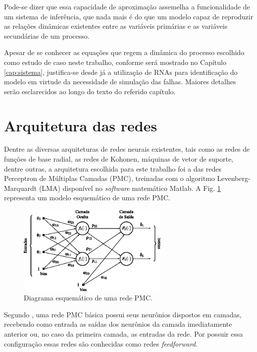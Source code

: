 Pode-se dizer que essa capacidade de aproximação assemelha a funcionalidade de
um sistema de inferência, que nada mais é do que um modelo capaz de reproduzir
as relações dinâmicas existentes entre as variáveis primárias e as variáveis
secundárias de um processo.

Apesar de se conhecer as equações que regem a dinâmica do processo escolhido
como estudo de caso neste trabalho, conforme será mostrado no Capítulo
\ref{cap:sistema}, justifica-se desde já a utilização de RNAs para identificação
do modelo em virtude da necessidade de simulação das falhas. Maiores detalhes
serão esclarecidos ao longo do texto do referido capítulo.

\section{Arquitetura das redes}
Dentre as diversas arquiteturas de redes neurais existentes, tais como as redes
de funções de base radial, as redes de Kohonen, máquinas de vetor de suporte,
dentre outras, a arquitetura escolhida para este trabalho foi a das redes
Perceptron de Múltiplas Camadas (PMC), treinadas com o algoritmo
Levenberg-Marquardt (LMA) disponível no {\it software} matemático Matlab\reg. A
Fig. \ref{fig:pmc} representa um modelo esquemático de uma rede PMC.

\begin{figure}[htb]
\centering
    \includegraphics[width=0.65\textwidth]{imgs/rnas/eps/pmc}
    \caption{Diagrama esquemático de uma rede PMC.}
    \label{fig:pmc}
\end{figure}


Segundo , uma rede PMC básica possui seus neurônios
dispostos em camadas, recebendo como entrada as saídas dos neurônios da camada
imediatamente anterior ou, no caso da primeira camada, as entradas da rede. Por
possuir essa configuração essas redes são conhecidas como redes {\it
feedforward}.


